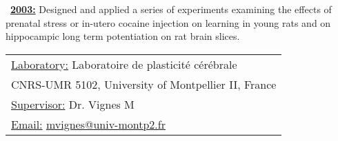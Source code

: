 \begin{minipage}[c]{7.7cm}
    \textbullet~\underline{\textbf{2003:}}	Designed and applied a series of experiments examining the effects of prenatal stress or in-utero cocaine injection on learning in young rats and on hippocampic long term potentiation on rat brain slices.
\end{minipage}
\hspace{3mm}
\begin{minipage}[c]{\textwidth}
    \setlength\minrowclearance{0.1cm}
    \setlength\arrayrulewidth{1.5pt}
    \small
    \begin{tabular}[c]{|l|}\hline
        \underline{Laboratory:} Laboratoire de plasticité cérébrale\\
        CNRS-UMR 5102, University of Montpellier II, France\\
        \underline{Supervisor:} Dr. Vignes M\\
        \underline{Email:} \href{mailto:mvignes@univ-montp2.fr}{mvignes@univ-montp2.fr}\\ \hline
    \end{tabular}
\end{minipage}
